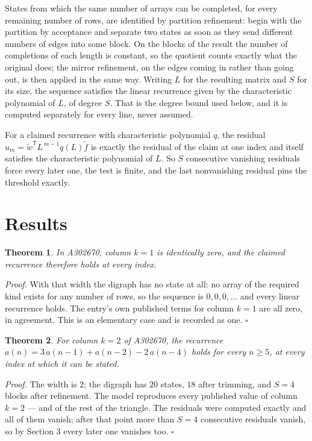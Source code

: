 \documentclass[11pt]{article}
\newtheorem{theorem}{Theorem}
\theoremstyle{definition}
\begin{document}
States from which the same number of arrays can be completed, for every remaining number of rows, are identified by partition refinement: begin with the partition by acceptance and separate two states as soon as they send different numbers of edges into some block. On the blocks of the result the number of completions of each length is constant, so the quotient counts exactly what the original does; the mirror refinement, on the edges coming in rather than going out, is then applied in the same way. Writing $L$ for the resulting matrix and $S$ for its size, the sequence satisfies the linear recurrence given by the characteristic polynomial of $L$, of degree $S$. That is the degree bound used below, and it is computed separately for every line, never assumed.

For a claimed recurrence with characteristic polynomial $q$, the residual $u_m = \tilde w^{\mathsf T}L^{\,m-1}q(L)\tilde f$ is exactly the residual of the claim at one index and itself satisfies the characteristic polynomial of $L$. So $S$ consecutive vanishing residuals force every later one, the test is finite, and the last nonvanishing residual pins the threshold exactly.

\section{Results}

\begin{theorem} In A302670, column $k = 1$ is identically zero, and the claimed recurrence therefore holds at every index.\end{theorem}

{\itshape Proof.} With that width the digraph has no state at all: no array of the required kind exists for any number of rows, so the sequence is $0,0,0,\dots$ and every linear recurrence holds. The entry's own published terms for column $k = 1$ are all zero, in agreement. This is an elementary case and is recorded as one. $\square$

\begin{theorem} For column $k = 2$ of A302670, the recurrence $a(n) = 3\,a(n-1) + a(n-2) - 2\,a(n-4)$ holds for every $n \ge 5$, at every index at which it can be stated.\end{theorem}

{\itshape Proof.} The width is $2$; the digraph has $20$ states, $18$ after trimming, and $S = 4$ blocks after refinement. The model reproduces every published value of column $k = 2$ --- and of the rest of the triangle. The residuals were computed exactly and all of them vanish; after that point more than $S = 4$ consecutive residuals vanish, so by Section 3 every later one vanishes too. $\square$
\end{document}

